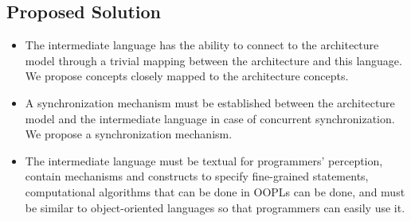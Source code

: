 \subsection{Proposed Solution}
\label{subsec:langrequirement}
\begin{itemize}
	\item The intermediate language has the ability to connect to the architecture model through a trivial mapping between the architecture and this language.
	We propose concepts closely mapped to the architecture concepts.
	
	\item A synchronization mechanism must be established between the architecture model and the intermediate language in case of concurrent synchronization. 
	We propose a synchronization mechanism.
	
	\item The intermediate language must be textual for programmers' perception, contain mechanisms and constructs to specify fine-grained statements, computational algorithms that can be done in OOPLs can be done, and must be similar to object-oriented languages so that programmers can easily use it.
	
\end{itemize}